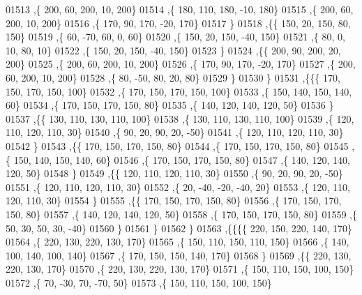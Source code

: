 \begin{DoxyCode}
01513     ,\{   200,    60,   200,    10,   200\}
01514     ,\{   180,   110,   180,   -10,   180\}
01515     ,\{   200,    60,   200,    10,   200\}
01516     ,\{   170,    90,   170,   -20,   170\}
01517     \}
01518    ,\{\{   150,    20,   150,    80,   150\}
01519     ,\{    60,   -70,    60,     0,    60\}
01520     ,\{   150,    20,   150,   -40,   150\}
01521     ,\{    80,     0,    10,    80,    10\}
01522     ,\{   150,    20,   150,   -40,   150\}
01523     \}
01524    ,\{\{   200,    90,   200,    20,   200\}
01525     ,\{   200,    60,   200,    10,   200\}
01526     ,\{   170,    90,   170,   -20,   170\}
01527     ,\{   200,    60,   200,    10,   200\}
01528     ,\{    80,   -50,    80,    20,    80\}
01529     \}
01530    \}
01531   ,\{\{\{   170,   150,   170,   150,   100\}
01532     ,\{   170,   150,   170,   150,   100\}
01533     ,\{   150,   140,   150,   140,    60\}
01534     ,\{   170,   150,   170,   150,    80\}
01535     ,\{   140,   120,   140,   120,    50\}
01536     \}
01537    ,\{\{   130,   110,   130,   110,   100\}
01538     ,\{   130,   110,   130,   110,   100\}
01539     ,\{   120,   110,   120,   110,    30\}
01540     ,\{    90,    20,    90,    20,   -50\}
01541     ,\{   120,   110,   120,   110,    30\}
01542     \}
01543    ,\{\{   170,   150,   170,   150,    80\}
01544     ,\{   170,   150,   170,   150,    80\}
01545     ,\{   150,   140,   150,   140,    60\}
01546     ,\{   170,   150,   170,   150,    80\}
01547     ,\{   140,   120,   140,   120,    50\}
01548     \}
01549    ,\{\{   120,   110,   120,   110,    30\}
01550     ,\{    90,    20,    90,    20,   -50\}
01551     ,\{   120,   110,   120,   110,    30\}
01552     ,\{    20,   -40,   -20,   -40,    20\}
01553     ,\{   120,   110,   120,   110,    30\}
01554     \}
01555    ,\{\{   170,   150,   170,   150,    80\}
01556     ,\{   170,   150,   170,   150,    80\}
01557     ,\{   140,   120,   140,   120,    50\}
01558     ,\{   170,   150,   170,   150,    80\}
01559     ,\{    50,    30,    50,    30,   -40\}
01560     \}
01561    \}
01562   \}
01563  ,\{\{\{\{   220,   150,   220,   140,   170\}
01564     ,\{   220,   130,   220,   130,   170\}
01565     ,\{   150,   110,   150,   110,   150\}
01566     ,\{   140,   100,   140,   100,   140\}
01567     ,\{   170,   150,   150,   140,   170\}
01568     \}
01569    ,\{\{   220,   130,   220,   130,   170\}
01570     ,\{   220,   130,   220,   130,   170\}
01571     ,\{   150,   110,   150,   100,   150\}
01572     ,\{    70,   -30,    70,   -70,    50\}
01573     ,\{   150,   110,   150,   100,   150\}

\end{DoxyCode}
